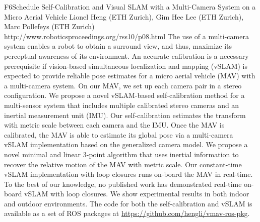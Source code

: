 \begin{spacing}{1.0}
\descriptionPaper
{F6}{Schedule}
{	
Self-Calibration and Visual SLAM with a Multi-Camera System on a Micro Aerial Vehicle 
}
{
Lionel Heng (ETH Zurich), Gim Hee Lee (ETH Zurich), Marc Pollefeys (ETH Zurich)
}
{
http://www.roboticsproceedings.org/rss10/p08.html
}
{
The use of a multi-camera system enables a robot to obtain a surround view, and thus, maximize its perceptual awareness of its environment. An accurate calibration is a necessary prerequisite if vision-based simultaneous localization and mapping (vSLAM) is expected to provide reliable pose estimates for a micro aerial vehicle (MAV) with a multi-camera system. On our MAV, we set up each camera pair in a stereo configuration. We propose a novel vSLAM-based self-calibration method for a multi-sensor system that includes multiple calibrated stereo cameras and an inertial measurement unit (IMU). Our self-calibration estimates the transform with metric scale between each camera and the IMU. Once the MAV is calibrated, the MAV is able to estimate its global pose via a multi-camera vSLAM implementation based on the generalized camera model. We propose a novel minimal and linear 3-point algorithm that uses inertial information to recover the relative motion of the MAV with metric scale. Our constant-time vSLAM implementation with loop closures runs on-board the MAV in real-time. To the best of our knowledge, no published work has demonstrated real-time on-board vSLAM with loop closures. We show experimental results in both indoor and outdoor environments. The code for both the self-calibration and vSLAM is available as a set of ROS packages at \url{https://github.com/hengli/vmav-ros-pkg}.
}




\end{spacing}
